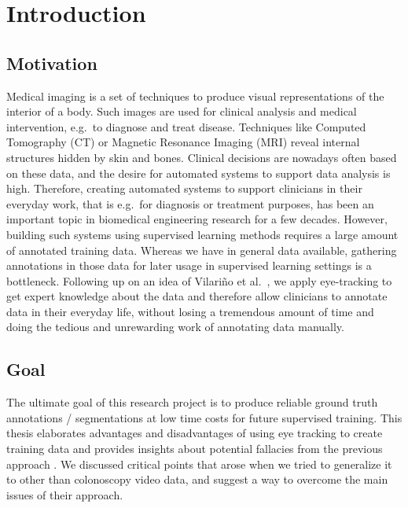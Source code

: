 \chapter{Introduction}
\label{chap:introduction}

\section{Motivation}
      Medical imaging is a set of techniques to produce visual representations of the interior of a body. 
      Such images are used for clinical analysis and medical intervention, e.g.\ to diagnose and treat disease. 
      Techniques like Computed Tomography (CT) or Magnetic Resonance Imaging (MRI) reveal internal structures hidden by skin and bones. 
      Clinical decisions are nowadays often based on these data, and the desire for automated systems to support data analysis is high. 
      Therefore, creating automated systems to support clinicians in their everyday work, that is e.g.\ for diagnosis or treatment purposes, has been an important topic in biomedical engineering research for a few decades. 
      However, building such systems using supervised learning methods requires a large amount of annotated training data. 
      Whereas we have in general data available, gathering annotations in those data for later usage in supervised learning settings is a bottleneck. 
      Following up on an idea of Vilari\~no et al.\ \cite{vilarino2007automatic}, we apply eye-tracking to get expert knowledge about the data and therefore allow clinicians to annotate data in their everyday life, without losing a tremendous amount of time and doing the tedious and unrewarding work of annotating data manually.
  
\section{Goal}
The ultimate goal of this research project is to produce reliable ground truth annotations / segmentations at low time costs for future supervised training. 
This thesis elaborates advantages and disadvantages of using eye tracking to create training data and provides insights about potential fallacies from the previous approach \cite{vilarino2007automatic}. 
We discussed critical points that arose when we tried to generalize it to other than colonoscopy video data, and suggest a way to overcome the main issues of their approach.

